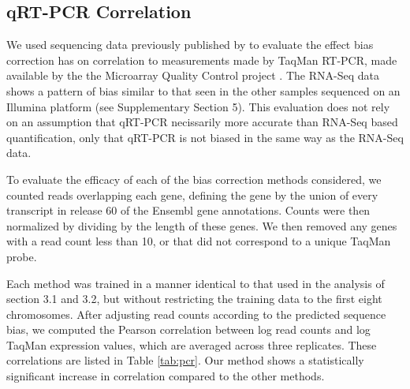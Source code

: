 \documentclass{bioinfo}
\begin{document}
\subsection{qRT-PCR Correlation}

We used sequencing data previously published by \citet{Au2010} to evaluate the
effect bias correction has on correlation to measurements made by TaqMan RT-PCR,
made available by the the Microarray Quality Control project \citep{Shi2006}. The
RNA-Seq data shows a pattern of bias similar to that seen in the other samples
sequenced on an Illumina platform (see Supplementary Section 5). This evaluation
does not rely on an assumption that qRT-PCR necissarily more accurate than
RNA-Seq based quantification, only that qRT-PCR is not biased in the same way as
the RNA-Seq data.

To evaluate the efficacy of each of the bias correction methods considered, we
counted reads overlapping each gene, defining the gene by the union of every
transcript in release 60 of the Ensembl gene annotations. Counts were then
normalized by dividing by the length of these genes. We then removed any genes
with a read count less than 10, or that did not correspond to a unique TaqMan
probe.

Each method was trained in a manner identical to that used in the analysis of
section 3.1 and 3.2, but without restricting the training data to the first
eight chromosomes.  After adjusting read counts according to the predicted
sequence bias, we computed the Pearson correlation between log read counts and
log TaqMan expression values, which are averaged across three replicates. These
correlations are listed in Table \ref{tab:pcr}. Our method shows a statistically
significant increase in correlation compared to the other methods.
\end{document}
